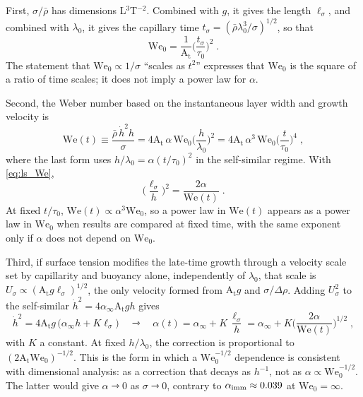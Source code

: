 \documentclass[11pt]{article}
\numberwithin{equation}{section}
\newcommand{\At}{\mathrm{A_t}}
\newcommand{\We}{\mathrm{We}_0}
\newcommand{\ls}{\ell_\sigma}
\newcommand{\hd}{\dot h}
\begin{document}
First, $\sigma/\bar\rho$ has dimensions L$^3$T$^{-2}$. Combined with $g$, it gives the length $\ls$, and combined with $\lambda_0$, it gives the capillary time $t_\sigma = (\bar\rho \lambda_0^3/\sigma)^{1/2}$, so that
\begin{equation}\label{eq:tsigma}
\We = \frac{1}{\At} \Big(\frac{t_\sigma}{\tau_0}\Big)^2 \;.
\end{equation}
The statement that $\We \propto 1/\sigma$ ``scales as $t^2$'' expresses that $\We$ is the square of a ratio of time scales; it does not imply a power law for $\alpha$.

Second, the Weber number based on the instantaneous layer width and growth velocity is
\begin{equation}\label{eq:We_t}
\mathrm{We}(t) \equiv \frac{\bar\rho \, \hd^2 h}{\sigma} = 4 \At \, \alpha \, \We \Big(\frac{h}{\lambda_0}\Big)^2
= 4 \At \, \alpha^3 \, \We \Big(\frac{t}{\tau_0}\Big)^4 \;,
\end{equation}
where the last form uses $h/\lambda_0 = \alpha(t/\tau_0)^2$ in the self-similar regime. With \eqref{eq:ls_We},
\begin{equation}\label{eq:ls_Wet}
\Big(\frac{\ls}{h}\Big)^2 = \frac{2 \alpha}{\mathrm{We}(t)} \;.
\end{equation}
At fixed $t/\tau_0$, $\mathrm{We}(t) \propto \alpha^3 \We$, so a power law in $\mathrm{We}(t)$ appears as a power law in $\We$ when results are compared at fixed time, with the same exponent only if $\alpha$ does not depend on $\We$.

Third, if surface tension modifies the late-time growth through a velocity scale set by capillarity and buoyancy alone, independently of $\lambda_0$, that scale is $U_\sigma \propto (\At g \ls)^{1/2}$, the only velocity formed from $\At g$ and $\sigma/\Delta \rho$. Adding $U_\sigma^2$ to the self-similar $\hd^2 = 4 \alpha_\infty \At g h$ gives
\begin{equation}\label{eq:capvel}
\hd^2 = 4 \At g \, \big(\alpha_\infty h + K \ls\big) \quad \rightarrowtriangle \quad
\alpha(t) = \alpha_\infty + K \, \frac{\ls}{h} = \alpha_\infty + K \Big(\frac{2 \alpha}{\mathrm{We}(t)}\Big)^{1/2} \;,
\end{equation}
with $K$ a constant. At fixed $h/\lambda_0$, the correction is proportional to $(2 \At \We)^{-1/2}$. This is the form in which a $\We^{-1/2}$ dependence is consistent with dimensional analysis: as a correction that decays as $h^{-1}$, not as $\alpha \propto \We^{-1/2}$. The latter would give $\alpha \rightarrowtriangle 0$ as $\sigma \rightarrowtriangle 0$, contrary to $\alpha_{\rm imm} \approx 0.039$ at $\We = \infty$.
\end{document}
